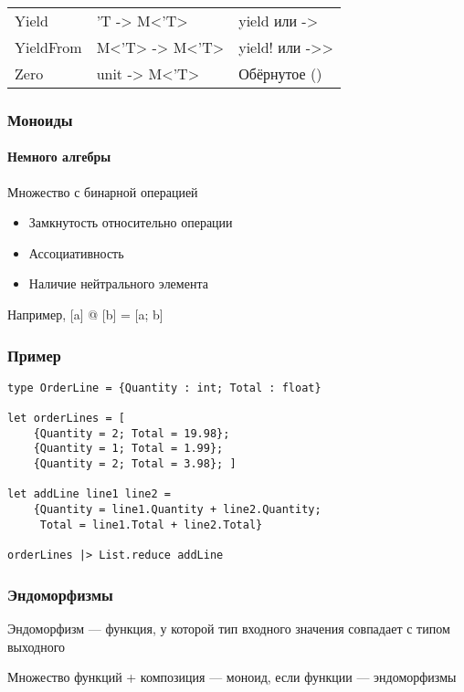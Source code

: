 \documentclass[xetex,mathserif,serif]{beamer}
\begin{document}
\begin{frame}
\begin{footnotesize}
\begin{tabu} {| X[0.5 l p] | X[1 l p] | X[1 l p] |}
                Yield                    & 'T -> M<'T>                                         & yield или ->                \\
                YieldFrom                & M<'T> -> M<'T>                                      & yield! или ->>              \\
                Zero                     & unit -> M<'T>                                       & Обёрнутое ()                \\
            \end{tabu}
        \end{footnotesize}
    \end{frame}

    \begin{frame}
        \frametitle{Моноиды}
        \framesubtitle{Немного алгебры}
        Множество с бинарной операцией
        \begin{itemize}
            \item Замкнутость относительно операции
            \item Ассоциативность
            \item Наличие нейтрального элемента
        \end{itemize}
        Например, [a] @ [b] = [a; b]
    \end{frame}

    \begin{frame}[fragile]
        \frametitle{Пример}
        \begin{verbatim}
type OrderLine = {Quantity : int; Total : float}

let orderLines = [
    {Quantity = 2; Total = 19.98};
    {Quantity = 1; Total = 1.99};
    {Quantity = 2; Total = 3.98}; ]
    
let addLine line1 line2 =
    {Quantity = line1.Quantity + line2.Quantity; 
     Total = line1.Total + line2.Total}
     
orderLines |> List.reduce addLine
        \end{verbatim}
    \end{frame}

    \begin{frame}
        \frametitle{Эндоморфизмы}
        Эндоморфизм --- функция, у которой тип входного значения совпадает с типом выходного
        
        \vspace{1cm}
        Множество функций + композиция --- моноид, если функции --- эндоморфизмы
    \end{frame}
\end{document}
